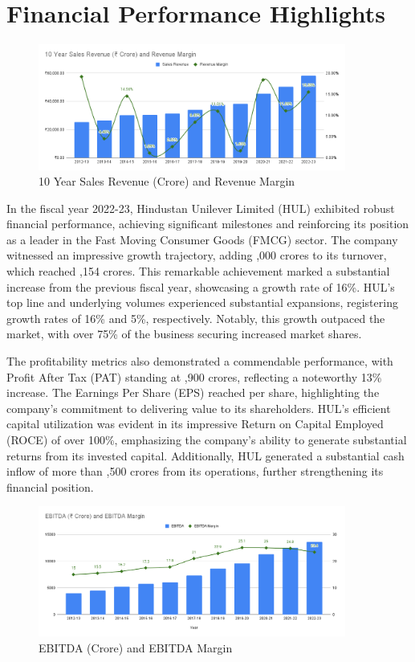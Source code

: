 \section{Financial Performance Highlights}
\begin{figure}[h]
    \centering
    \includegraphics[width=0.9\textwidth]{images/10 Year Sales Revenue.png}
    \caption{10 Year Sales Revenue (\rupee  Crore) and Revenue Margin}
    \label{fig:your_svg_image}
  \end{figure}
In the fiscal year 2022-23, Hindustan Unilever Limited (HUL) exhibited robust financial performance, achieving significant milestones and reinforcing its position as a leader in the Fast Moving Consumer Goods (FMCG) sector. The company witnessed an impressive growth trajectory, adding ,000 crores to its turnover, which reached ,154 crores. This remarkable achievement marked a substantial increase from the previous fiscal year, showcasing a growth rate of 16\%. HUL's top line and underlying volumes experienced substantial expansions, registering growth rates of 16\% and 5\%, respectively. Notably, this growth outpaced the market, with over 75\% of the business securing increased market shares.

The profitability metrics also demonstrated a commendable performance, with Profit After Tax (PAT) standing at ,900 crores, reflecting a noteworthy 13\% increase. The Earnings Per Share (EPS) reached  per share, highlighting the company's commitment to delivering value to its shareholders. HUL's efficient capital utilization was evident in its impressive Return on Capital Employed (ROCE) of over 100\%, emphasizing the company's ability to generate substantial returns from its invested capital. Additionally, HUL generated a substantial cash inflow of more than ,500 crores from its operations, further strengthening its financial position.

\begin{figure}[h]
    \centering
    \includegraphics[width=0.9\textwidth]{images/EBITDA.png}
    \caption{EBITDA (\rupee Crore) and EBITDA Margin}
    \label{fig:EBITDA}
  \end{figure}

